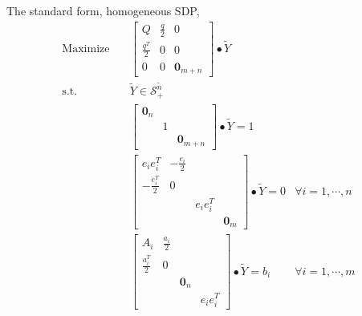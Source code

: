 \documentclass[../main]{subfiles}
\begin{document}
The standard form, homogeneous SDP,
\begin{equation}
    \begin{aligned}
        \mathrm{Maximize}\quad & \begin{bmatrix}
            Q & \frac{q}{2} & 0 \\ \frac{q^T}{2} & 0 & 0 \\ 0 & 0 & \bm 0_{m+n}
        \end{bmatrix} \bullet \tilde Y                               \\
        \mathrm{s.t.} \quad    & \tilde{Y}  \in \mathscr S^{\tilde{n}}_+                                   \\
                               & \begin{bmatrix}  \bm 0_n &  &  \\  & 1 &  \\  & & \bm 0_{m+n} \end{bmatrix} \bullet \tilde Y = 1                           \\
                               & \begin{bmatrix}
            e_ie_i^T         & -\frac{e_i}{2} &          &         \\
            -\frac{e_i^T}{2} & 0              &          &         \\
                             &                & e_ie_i^T &         \\
                             &                &          & \bm 0_m
        \end{bmatrix} \bullet \tilde Y = 0   & \forall i=1,\cdots, n \\
                               & \begin{bmatrix}
            A_i             & \frac{a_i}{2} &         &          \\
            \frac{a_i^T}{2} & 0             &         &          \\
                            &               & \bm 0_n &          \\
                            &               &         & e_ie_i^T
        \end{bmatrix}\bullet \tilde{Y} = b_i & \forall i=1,\cdots, m \\
    \end{aligned}
\end{equation}
\end{document}
